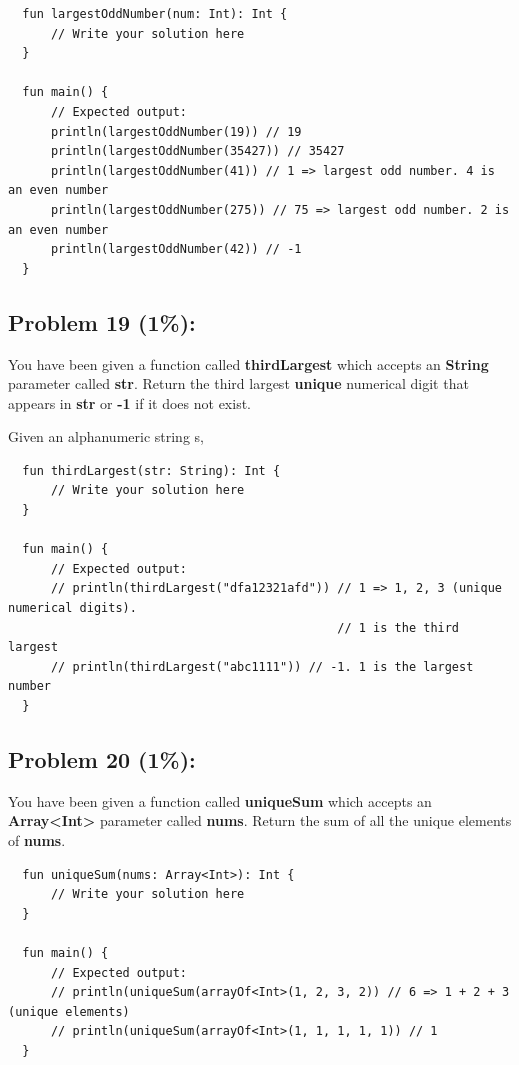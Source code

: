 \documentclass{article}
\begin{document}
\begin{verbatim}
  fun largestOddNumber(num: Int): Int {
      // Write your solution here   
  }

  fun main() {
      // Expected output:
      println(largestOddNumber(19)) // 19
      println(largestOddNumber(35427)) // 35427
      println(largestOddNumber(41)) // 1 => largest odd number. 4 is an even number
      println(largestOddNumber(275)) // 75 => largest odd number. 2 is an even number
      println(largestOddNumber(42)) // -1
  }
\end{verbatim}

\subsection*{Problem 19 (1\%):}
You have been given a function called \textbf{thirdLargest} which accepts an \textbf{String} parameter called \textbf{str}. Return the third largest \textbf{unique} numerical digit that appears in \textbf{str} or \textbf{-1} if it does not exist.

Given an alphanumeric string s, 
\begin{verbatim}
  fun thirdLargest(str: String): Int {
      // Write your solution here
  }

  fun main() {
      // Expected output:
      // println(thirdLargest("dfa12321afd")) // 1 => 1, 2, 3 (unique numerical digits). 
                                              // 1 is the third largest
      // println(thirdLargest("abc1111")) // -1. 1 is the largest number
  }
\end{verbatim}

\subsection*{Problem 20 (1\%):}
You have been given a function called \textbf{uniqueSum} which accepts an \textbf{Array<Int>} parameter called \textbf{nums}. Return the sum of all the unique elements of \textbf{nums}.

\begin{verbatim}
  fun uniqueSum(nums: Array<Int>): Int {
      // Write your solution here 
  }

  fun main() {
      // Expected output:
      // println(uniqueSum(arrayOf<Int>(1, 2, 3, 2)) // 6 => 1 + 2 + 3 (unique elements)
      // println(uniqueSum(arrayOf<Int>(1, 1, 1, 1, 1)) // 1
  }
\end{verbatim}
\end{document}
